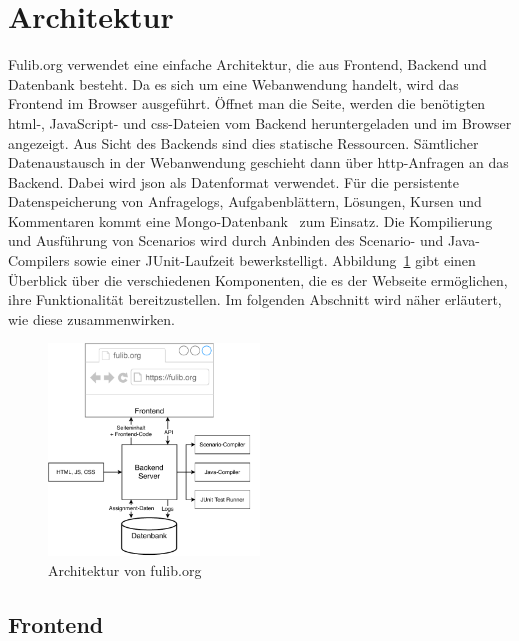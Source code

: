 \section{Architektur}\label{sec:architecture}

Fulib.org verwendet eine einfache Architektur, die aus Frontend, Backend und Datenbank besteht.
Da es sich um eine Webanwendung handelt, wird das Frontend im Browser ausgeführt.
Öffnet man die Seite, werden die benötigten \ac{html}-, JavaScript- und \ac{css}-Dateien vom Backend heruntergeladen und im Browser angezeigt.
Aus Sicht des Backends sind dies statische Ressourcen.
Sämtlicher Datenaustausch in der Webanwendung geschieht dann über \ac{http}-Anfragen an das Backend.
Dabei wird \ac{json} als Datenformat verwendet.
Für die persistente Datenspeicherung von Anfragelogs, Aufgabenblättern, Lösungen, Kursen und Kommentaren kommt eine Mongo-Datenbank~\cite{mongodb} zum Einsatz.
Die Kompilierung und Ausführung von Scenarios wird durch Anbinden des Scenario- und Java-Compilers sowie einer JUnit-Laufzeit bewerkstelligt.
Abbildung~\ref{fig:website-architecture} gibt einen Überblick über die verschiedenen Komponenten, die es der Webseite ermöglichen, ihre Funktionalität bereitzustellen.
Im folgenden Abschnitt wird näher erläutert, wie diese zusammenwirken.

\begin{figure}
    \centering
    \includegraphics[width=0.5\textwidth]{chapter/fulib.org/img/architecture.pdf}
    \caption{Architektur von fulib.org}
    \label{fig:website-architecture}
\end{figure}

\subsection{Frontend}\label{subsec:frontend}

